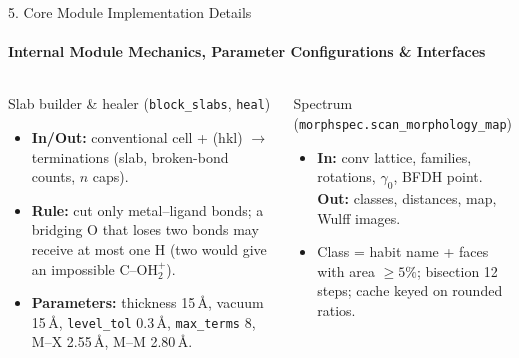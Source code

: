 \documentclass[aspectratio=169, 11pt]{beamer}
\begin{document}
\begin{frame}[shrink=10]{5. Core Module Implementation Details}
    \framesubtitle{Internal Module Mechanics, Parameter Configurations \& Interfaces}
    \begin{columns}[T]
        \begin{block}{Slab builder \& healer (\texttt{block\_slabs}, \texttt{heal})}
            \scriptsize
            \begin{itemize}
                \item \textbf{In/Out:} conventional cell + (hkl) $\rightarrow$ terminations (slab, broken-bond counts, $n$ caps).
                \item \textbf{Rule:} cut only metal--ligand bonds; a bridging O that loses two bonds may receive at most one H (two would give an impossible C--OH$_2^+$).
                \item \textbf{Parameters:} thickness 15\,\AA, vacuum 15\,\AA, \texttt{level\_tol} 0.3\,\AA, \texttt{max\_terms} 8, M--X 2.55\,\AA, M--M 2.80\,\AA.
            \end{itemize}
        \end{block}
        \begin{block}{Spectrum (\texttt{morphspec.scan\_morphology\_map})}
            \scriptsize
            \begin{itemize}
                \item \textbf{In:} conv lattice, families, rotations, $\gamma_0$, BFDH point. \textbf{Out:} classes, distances, map, Wulff images.
                \item Class = habit name + faces with area $\ge 5\%$; bisection 12 steps; cache keyed on rounded ratios.
            \end{itemize}
        \end{block}
        \centering
        \vspace{0.1cm}
    \end{columns}
\end{frame}
\end{document}
